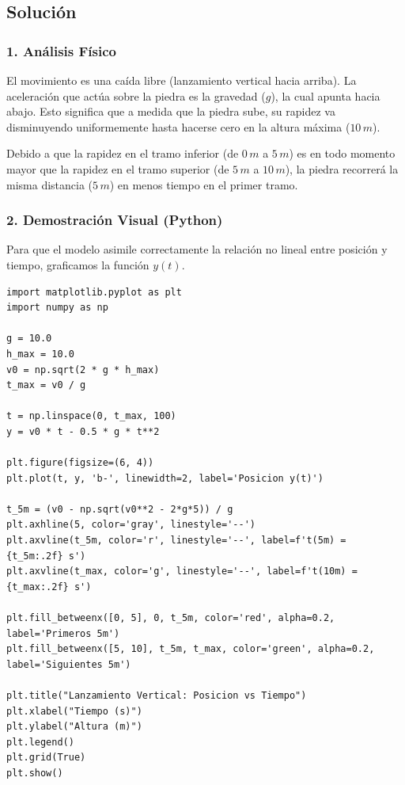 \documentclass[12pt, a4paper]{article}
\begin{document}
\subsection*{Solución}

\subsubsection*{1. Análisis Físico}
El movimiento es una caída libre (lanzamiento vertical hacia arriba). La aceleración que actúa sobre la piedra es la gravedad ($g$), la cual apunta hacia abajo. Esto significa que a medida que la piedra sube, su rapidez va disminuyendo uniformemente hasta hacerse cero en la altura máxima ($10 \, \si{m}$).

Debido a que la rapidez en el tramo inferior (de $0 \, \si{m}$ a $5 \, \si{m}$) es en todo momento mayor que la rapidez en el tramo superior (de $5 \, \si{m}$ a $10 \, \si{m}$), la piedra recorrerá la misma distancia ($5 \, \si{m}$) en menos tiempo en el primer tramo.

\subsubsection*{2. Demostración Visual (Python)}
Para que el modelo asimile correctamente la relación no lineal entre posición y tiempo, graficamos la función $y(t)$.

\begin{lstlisting}
import matplotlib.pyplot as plt
import numpy as np

g = 10.0
h_max = 10.0
v0 = np.sqrt(2 * g * h_max)
t_max = v0 / g

t = np.linspace(0, t_max, 100)
y = v0 * t - 0.5 * g * t**2

plt.figure(figsize=(6, 4))
plt.plot(t, y, 'b-', linewidth=2, label='Posicion y(t)')

t_5m = (v0 - np.sqrt(v0**2 - 2*g*5)) / g
plt.axhline(5, color='gray', linestyle='--')
plt.axvline(t_5m, color='r', linestyle='--', label=f't(5m) = {t_5m:.2f} s')
plt.axvline(t_max, color='g', linestyle='--', label=f't(10m) = {t_max:.2f} s')

plt.fill_betweenx([0, 5], 0, t_5m, color='red', alpha=0.2, label='Primeros 5m')
plt.fill_betweenx([5, 10], t_5m, t_max, color='green', alpha=0.2, label='Siguientes 5m')

plt.title("Lanzamiento Vertical: Posicion vs Tiempo")
plt.xlabel("Tiempo (s)")
plt.ylabel("Altura (m)")
plt.legend()
plt.grid(True)
plt.show()
\end{lstlisting}
\end{document}
